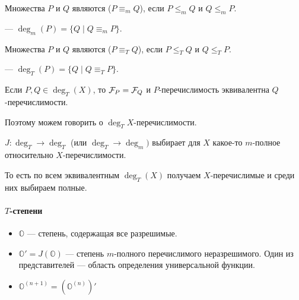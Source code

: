 \begin{defn}[]
	Множества $ P$ и $ Q$ являются  ($ P \equiv _m Q$), если $ P \le _m Q$ и $ Q \le _m P$.

	\noindent
	 --- $ \deg_m(P) = \{Q \mid Q \equiv _m P\} $.
\end{defn}

\begin{defn}[]
	Множества $ P$ и $ Q$ являются  ($ P \equiv _T Q$), если $ P \le _T Q$ и $ Q \le _T P$.

	\noindent
	 --- $ \deg_T(P) = \{Q \mid Q \equiv _T P\} $.
\end{defn}

\begin{note}
	Если $ P, Q \in \deg_T(X)$, то $ \mathcal{F}_P = \mathcal{F}_Q$ и  $ P$-перечислимость  эквивалентна  $ Q$-перечислимости.

	Поэтому можем говорить о $\deg_T X$-перечислимости.
\end{note}

\begin{defn}
	 $ J\colon \deg_T \to \deg_T $ (или $ \deg_T \to \deg_m) $ выбирает для $ X$ какое-то $ m$-полное относительно $ X$-перечислимости.

	\noindent
	То есть по всем эквивалентным $ \deg_T(X)$ получаем $ X$-перечислимые и среди них выбираем полные. 
\end{defn}
\begin{figure}[ht]
    \centering
    \label{fig:jump-img}
\end{figure}

\paragraph{$ T$-степени}
\begin{itemize}
	\item $ \mathbb{O}$ --- степень, содержащая все разрешимые.
	\item $ \mathbb{O}' = J(\mathbb{O}) $ --- степень $ m$-полного перечислимого неразрешимого. Один из представителей --- область определения универсальной функции.
	\item $ \mathbb{O}^{(n+1)}= \left(\mathbb{O}^{(n)}\right)'$
\end{itemize}

